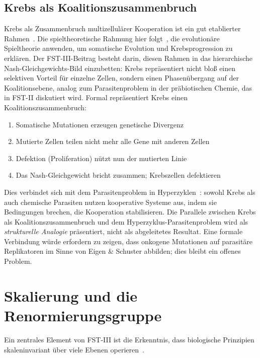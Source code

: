 \documentclass[12pt,a4paper]{article}
\theoremstyle{remark}
\begin{document}
\subsection{Krebs als Koalitionszusammenbruch}

Krebs als Zusammenbruch multizellulärer Kooperation ist ein gut etablierter Rahmen~\citep{AktipisCancer}. Die spieltheoretische Rahmung hier folgt~\citet{AktipisCancer}, die evolutionäre Spieltheorie anwenden, um somatische Evolution und Krebsprogression zu erklären. Der FST-III-Beitrag besteht darin, diesen Rahmen in das hierarchische Nash-Gleichgewichts-Bild einzubetten: Krebs repräsentiert nicht bloß einen selektiven Vorteil für einzelne Zellen, sondern einen Phasenübergang auf der Koalitionsebene, analog zum Parasitenproblem in der präbiotischen Chemie, das in FST-II diskutiert wird. Formal repräsentiert Krebs einen Koalitionszusammenbruch:
\begin{enumerate}
    \item Somatische Mutationen erzeugen genetische Divergenz
    \item Mutierte Zellen teilen nicht mehr alle Gene mit anderen Zellen
    \item Defektion (Proliferation) nützt nun der mutierten Linie
    \item Das Nash-Gleichgewicht bricht zusammen; Krebszellen \glqq defektieren\grqq{}
\end{enumerate}

Dies verbindet sich mit dem Parasitenproblem in Hyperzyklen~\citep{FSTII}: sowohl Krebs als auch chemische Parasiten nutzen kooperative Systeme aus, indem sie Bedingungen brechen, die Kooperation stabilisieren. Die Parallele zwischen Krebs als Koalitionszusammenbruch und dem Hyperzyklus-Parasitenproblem wird als \emph{strukturelle Analogie} präsentiert, nicht als abgeleitetes Resultat. Eine formale Verbindung würde erfordern zu zeigen, dass onkogene Mutationen auf parasitäre Replikatoren im Sinne von Eigen \& Schuster abbilden; dies bleibt ein offenes Problem.

\section{Skalierung und die Renormierungsgruppe}
\label{sec:renormalization}

Ein zentrales Element von FST-III ist die Erkenntnis, dass biologische Prinzipien skaleninvariant über viele Ebenen operieren~\citep{ScaleRGFrontiers,ScaleRGResearch}.
\end{document}
